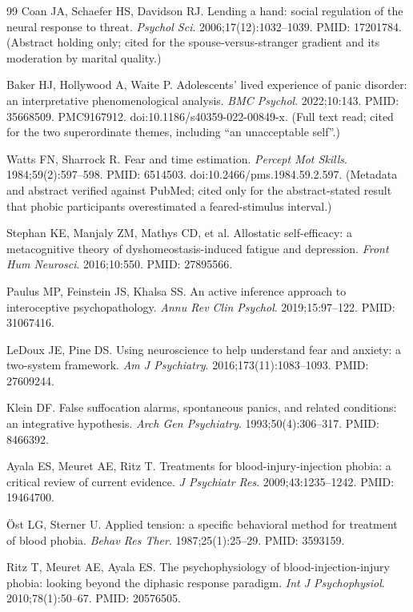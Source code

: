 \documentclass[9pt,twocolumn]{article}
\begin{document}
\begin{thebibliography}{99}
Coan JA, Schaefer HS, Davidson RJ. Lending a hand: social regulation of the neural response to threat. \emph{Psychol Sci}. 2006;17(12):1032--1039. PMID: 17201784. (Abstract holding only; cited for the spouse-versus-stranger gradient and its moderation by marital quality.)

Baker HJ, Hollywood A, Waite P. Adolescents' lived experience of panic disorder: an interpretative phenomenological analysis. \emph{BMC Psychol}. 2022;10:143. PMID: 35668509. PMC9167912. doi:10.1186/s40359-022-00849-x. (Full text read; cited for the two superordinate themes, including ``an unacceptable self''.)

Watts FN, Sharrock R. Fear and time estimation. \emph{Percept Mot Skills}. 1984;59(2):597--598. PMID: 6514503. doi:10.2466/pms.1984.59.2.597. (Metadata and abstract verified against PubMed; cited only for the abstract-stated result that phobic participants overestimated a feared-stimulus interval.)

Stephan KE, Manjaly ZM, Mathys CD, et al. Allostatic self-efficacy: a metacognitive theory of dyshomeostasis-induced fatigue and depression. \emph{Front Hum Neurosci}. 2016;10:550. PMID: 27895566.

Paulus MP, Feinstein JS, Khalsa SS. An active inference approach to interoceptive psychopathology. \emph{Annu Rev Clin Psychol}. 2019;15:97--122. PMID: 31067416.

LeDoux JE, Pine DS. Using neuroscience to help understand fear and anxiety: a two-system framework. \emph{Am J Psychiatry}. 2016;173(11):1083--1093. PMID: 27609244.

Klein DF. False suffocation alarms, spontaneous panics, and related conditions: an integrative hypothesis. \emph{Arch Gen Psychiatry}. 1993;50(4):306--317. PMID: 8466392.

Ayala ES, Meuret AE, Ritz T. Treatments for blood-injury-injection phobia: a critical review of current evidence. \emph{J Psychiatr Res}. 2009;43:1235--1242. PMID: 19464700.

\"Ost LG, Sterner U. Applied tension: a specific behavioral method for treatment of blood phobia. \emph{Behav Res Ther}. 1987;25(1):25--29. PMID: 3593159.

Ritz T, Meuret AE, Ayala ES. The psychophysiology of blood-injection-injury phobia: looking beyond the diphasic response paradigm. \emph{Int J Psychophysiol}. 2010;78(1):50--67. PMID: 20576505.


\end{thebibliography}
\end{document}
